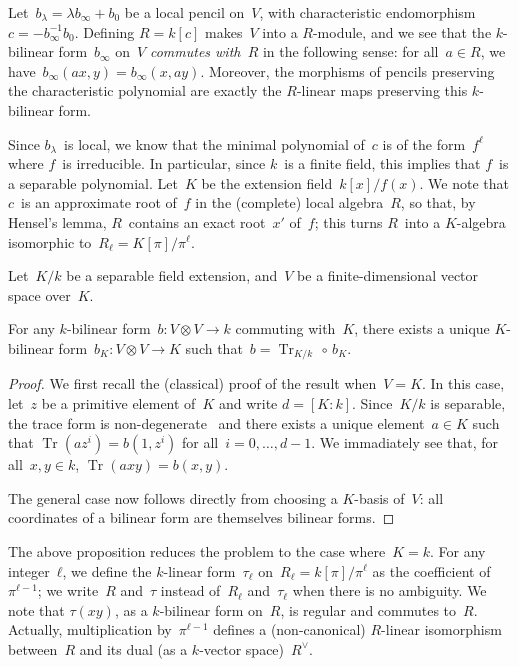 \documentclass{article}%
\DeclareMathOperator\Tr{Tr}
\begin{document}
Let~$b_{λ} = λ b_{∞} + b_0$ be a local pencil on~$V$, with characteristic
endomorphism~$c = - b_{∞}^{-1} b_0$.
Defining $R = k[c]$ makes~$V$ into a $R$-module, and we see that the
$k$-bilinear form~$b_{∞}$ on~$V$ \emph{commutes with~$R$} in the
following sense: for all~$a ∈ R$, we have~$b_{∞} (a x, y) = b_{∞} (x, a
y)$.
Moreover, the morphisms of pencils preserving the characteristic
polynomial are exactly the $R$-linear maps preserving this $k$-bilinear
form.

Since $b_{λ}$~is local, we know that
the minimal polynomial of~$c$ is of the form~$f^ℓ$ where $f$~is irreducible.
In particular, since $k$~is a finite field,
this implies that $f$~is a separable polynomial.
Let~$K$ be the extension field~$k[x] / f(x)$.
We note that $c$~is an approximate root of~$f$ in the (complete) local
algebra~$R$, so that, by Hensel's lemma, $R$~contains an exact root~$x'$
of~$f$; this turns $R$~into a $K$-algebra isomorphic to~$R_ℓ = K[π]/π^ℓ$.

\begin{prop}\label{prop:trace-form}%
Let~$K/k$ be a separable field extension, and~$V$ be a finite-dimensional
vector space over~$K$.

For any $k$-bilinear form~$b: V ⊗ V → k$ commuting with~$K$, there
exists a unique $K$-bilinear form~$b_K: V ⊗ V → K$ such that~$b =
\Tr_{K/k} \,∘ \,b_K$.
\end{prop}

\begin{proof}
We first recall the (classical) proof of the result when~$V = K$.
In this case, let~$z$ be a primitive element of~$K$ and write $d =
[K:k]$. Since~$K/k$ is separable, the trace form is
non-degenerate~\cite[VI~5.2]{lang-algebra} and there exists a unique
element~$a ∈ K$ such that $\Tr (a z^i) = b(1, z^i)$ for all~$i=0, …,
d-1$.
We immadiately see that, for all~$x, y ∈ k$, $\Tr (a x y) = b(x, y)$.

The general case now follows directly from choosing a $K$-basis of~$V$:
all coordinates of a bilinear form are themselves bilinear forms.
\end{proof}%

The above proposition reduces the problem to the case where~$K = k$.
For any integer~$ℓ$, we define the $k$-linear form~$τ_ℓ$ on~$R_ℓ =
k[π]/π^ℓ$ as the coefficient of~$π^{ℓ-1}$; we write~$R$ and~$τ$ instead
of~$R_ℓ$ and~$τ_ℓ$ when there is no ambiguity.
We note that $τ(xy)$, as a $k$-bilinear form on~$R$, is regular and
commutes to~$R$.
Actually, multiplication by~$π^{ℓ-1}$ defines a (non-canonical)
$R$-linear isomorphism between~$R$ and its dual (as a $k$-vector
space)~$R^{∨}$.
\end{document}
